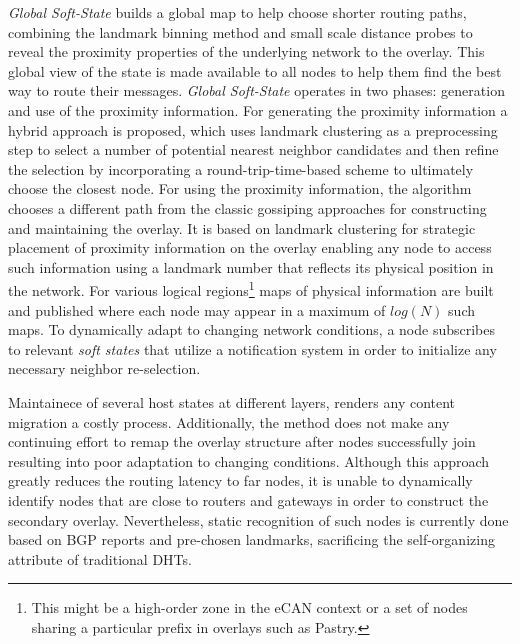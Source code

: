 \textit{Global Soft-State} \cite{XTZ2003} builds a global map to help
choose shorter routing paths, combining the landmark binning method and small
scale distance probes to reveal the proximity properties of the underlying
network to the overlay. %
This global view of the
state is made available to all nodes to help them find the best way to
route their messages. \textit{Global Soft-State} operates in two phases: 
generation and use of the proximity information. For generating the proximity
information a hybrid approach is proposed, which uses landmark clustering as a
preprocessing step to select a number of potential nearest neighbor
candidates and then refine the selection by incorporating a
round-trip-time-based scheme to ultimately choose the closest node. For using
the proximity information, the algorithm chooses a different path from the
classic gossiping approaches for constructing and maintaining the overlay. It is
based on landmark clustering for strategic placement of proximity information on
the overlay enabling any node to access such information using a landmark number
that reflects its physical position in the network. For various logical
regions\footnote{This might be a high-order zone in the eCAN\cite{xu_ecan_2002}
context or a set of nodes sharing a particular prefix in overlays such as
Pastry\cite{antony_pastry_2001}.} maps of physical information are built and
published where each node may appear in a maximum of $log\left( N \right)$ such
maps. To dynamically adapt to changing network conditions, a node subscribes to
relevant \emph{soft states} that utilize a notification system in order to
initialize any necessary neighbor re-selection.

Maintainece of several host states at different layers, renders any content
migration a costly process. Additionally, the method does not make any
continuing effort to remap
the overlay structure after nodes successfully join resulting into poor
adaptation to changing conditions. Although this approach greatly reduces the
routing latency to far nodes, it is unable to dynamically identify nodes that
are close to routers and gateways in order to construct the secondary overlay.
Nevertheless, static recognition of such nodes is currently done based on BGP
reports and pre-chosen landmarks, sacrificing the self-organizing attribute of
traditional DHTs.

